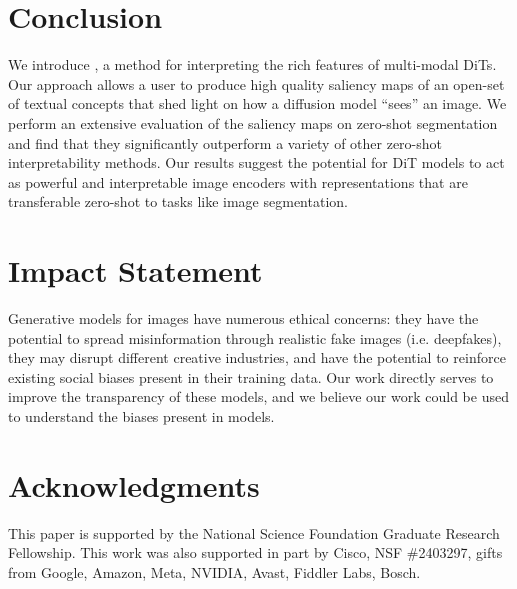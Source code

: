 \section{Conclusion}

We introduce \tool{}, a method for interpreting the rich features of multi-modal DiTs. Our approach allows a user to produce high quality saliency maps of an open-set of textual concepts that shed light on how a diffusion model ``sees'' an image. We perform an extensive evaluation of the saliency maps on zero-shot segmentation and find that they significantly outperform a variety of other zero-shot interpretability methods. Our results suggest the potential for DiT models to act as powerful and interpretable image encoders with representations that are transferable zero-shot to tasks like image segmentation. 


\section{Impact Statement}

Generative models for images have numerous ethical concerns: they have the potential to spread misinformation through realistic fake images (i.e. deepfakes), they may disrupt different creative industries, and have the potential to reinforce existing social biases present in their training data. Our work directly serves to improve the transparency of these models, and we believe our work could be used to understand the biases present in models. 


\section{Acknowledgments}

This paper is supported by the National Science Foundation Graduate Research Fellowship. This work was also supported in part by Cisco, NSF \#2403297, gifts from Google, Amazon, Meta, NVIDIA, Avast, Fiddler Labs, Bosch. 